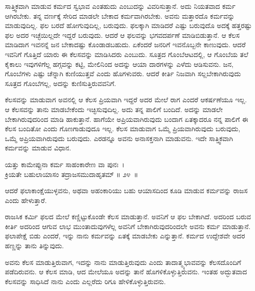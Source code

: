 ಸಾತ್ತ್ವಿಕವಾಗಿ ಮಾಡುವ ಕರ್ಮದ ಸ್ವಭಾವ ಎಂತಹುದು ಎಂಬುದನ್ನು ವಿವರಿಸುತ್ತಾನೆ. ಅದು ನಿಯತವಾದ ಕರ್ಮ ಆಗಿರಬೇಕು. ತನ್ನ ವರ್ಣಕ್ಕೆ ಸೇರಿದ ಮಾಡಲೇ ಬೇಕಾದ ಕರ್ಮವಾಗಿರಬೇಕು. ಅವನು ಮತ್ತಾರದೊ ಕರ್ಮವನ್ನು ಮಾಡುವುದಿಲ್ಲ. ಫಲ ಬರದೆ ಹೋಗುವುದಿಲ್ಲ, ಬರುವುದು. ಫಲಕ್ಕಾಗಿ ಮಾಡಿದರೆ ಎಷ್ಟು ಬರುವುದೊ ಅದಕ್ಕೆ ಹತ್ತರಷ್ಟು ಫಲ ಅದರ ಇಚ್ಛೆಯಿಲ್ಲದೇ ಇದ್ದರೆ ಬರುವುದು. ಆದರೆ ಆ ಫಲವನ್ನು ಭಗವದರ್ಪಣೆ ಮಾಡಿಬಿಡುತ್ತಾನೆ. ಆ ಕೆಲಸ ಮಾಡಿದಾಗ ಇವನನ್ನೆ ಜನ ಬೇಕಾದಷ್ಟು ಕೊಂಡಾಡಬಹುದು. ಏಕೆಂದರೆ ಜನರಿಗೆ ಇವನೊಬ್ಬನೇ ಕಾಣುವುದು. ಆದರೆ ಇವನಿಗೆ ಗೊತ್ತಿದೆ ಯಾರು ಈ ಕೆಲಸವನ್ನು ಮಾಡಿಸಿದರು ಎಂಬುದು. ಸೂತ್ರದ ಗೊಂಬೆಆಟದಲ್ಲಿ, ಆ ಗೊಂಬೆಯ ತಲೆ ಕೈಕಾಲು ಇವುಗಳಿಗೆಲ್ಲ ಹಗ್ಗವನ್ನು ಕಟ್ಟಿ, ಮೇಲಿನಿಂದ ಅದನ್ನು ಆಯಾ ದಾರಗಳನ್ನು ಎಳೆದು ಆಡಿಸುವನು. ಜನ, ಗೊಂಬೆಗಳು ಎಷ್ಟು ಚೆನ್ನಾಗಿ ಕುಣಿಯುತ್ತವೆ ಎಂದು ಹೊಗಳುವರು. ಆದರೆ ಕೀರ್ತಿ ನಿಜವಾಗಿ ಸಲ್ಲಬೇಕಾಗಿರುವುದು ಸೂತ್ರದ ಗೊಂಬೆಗಲ್ಲ, ಅದನ್ನು ಕುಣಿಸುತ್ತಿರುವವನಿಗೆ.

ಕೆಲಸವನ್ನು ಮಾಡುವಾಗ ಅವನಲ್ಲಿ ಆ ಕೆಲಸ ಪ್ರಿಯವಾಗಿ ಇದ್ದರೆ ಅದರ ಮೇಲೆ ರಾಗ ಎಂದರೆ ಆಕರ್ಷಣೆಯೂ ಇಲ್ಲ. ಆ ಕೆಲಸವನ್ನು ತಾನು ಮಾಡಬೇಕೆಂದು ಇಚ್ಛಿಸುವುದಿಲ್ಲ. ಅದು ತನ್ನ ಪಾಲಿಗೆ ಬಂದಿದೆ. ಅದನ್ನು ಮಾಡಲೇ ಬೇಕಾಗಿರುವುದರಿಂದ ಮಾಡಿ ಹಾಕುತ್ತಾನೆ. ಹಾಗೆಯೇ ಅಪ್ರಿಯವಾಗಿರುವುದು ಬಂದಾಗ ಏತಕ್ಕಾದರೂ ನನ್ನ ಪಾಲಿಗೆ ಈ ಕೆಲಸ ಬಂದಿತೋ ಎಂದು ಗೊಣಗಾಡುವುದೂ ಇಲ್ಲ. ಕೆಲಸ ಮಾಡುವಾಗ ಒಮ್ಮೆ ಪ್ರಿಯವಾಗಿರುವುದು ಬರುವುದು, ಒಮ್ಮೆ ಅಪ್ರಿಯವಾಗಿರುವುದು ಬರುವುದು. ಎರಡನ್ನೂ ಅವನು ಅನಾಸಕ್ತನಾಗಿ ಮಾಡುವನು. ಇದೇ ಸಾತ್ತ್ವಿಕವಾಗಿ ಕರ್ಮವನ್ನು ಮಾಡುವ ವಿಧಾನ.

\begin{shloka}
ಯತ್ತು ಕಾಮೇಪ್ಸುನಾ ಕರ್ಮ ಸಾಹಂಕಾರೇಣ ವಾ ಪುನಃ~।\\ಕ್ರಿಯತೇ ಬಹುಲಾಯಾಸಂ ತದ್ರಾಜಸಮುದಾಹೃತಮ್ \hfill॥ ೨೪~॥
\end{shloka}

\begin{artha}
ಆದರೆ ಫಲಾಕಾಂಕ್ಷೆಯುಳ್ಳವನು, ಅಥವಾ ಅಹಂಕಾರಿಯು ಬಹು ಆಯಾಸದಿಂದ ಕೂಡಿ ಮಾಡುವ ಕರ್ಮವನ್ನು ರಾಜಸ ಎಂದು ಹೇಳುತ್ತಾರೆ.
\end{artha}

ರಾಜಸಿಕ ಕರ್ಮಿ ಫಲದ ಮೇಲೆ ಕಣ್ಣಿಟ್ಟುಕೊಂಡೇ ಕೆಲಸ ಮಾಡುತ್ತಾನೆ. ಅವನಿಗೆ ಆ ಫಲ ಬೇಕಾಗಿದೆ. ಅದರಿಂದ ಬರುವ ಕೀರ್ತಿ ಅದರಿಂದ ಆಗುವ ಲಾಭ ಮುಂತಾದುವುಗಳೆಲ್ಲ ಅವನಿಗೆ ಬೇಕಾಗಿರುವುದರಿಂದಲೇ ಅವನು ಕರ್ಮ ಮಾಡುತ್ತಾನೆ. ಫಲಾಪೇಕ್ಷೆ ಬಿಡು ಎಂದರೆ, ಇನ್ನು ನಾನು ಕರ್ಮವನ್ನು ಏತಕ್ಕೆ ಮಾಡಬೇಕು ಎನ್ನುತ್ತಾನೆ. ಕರ್ಮದ ಉದ್ದೇಶವೇ ಅದರ ಹಣ್ಣನ್ನು ತಾನು ತಿನ್ನುವುದು.

ಅವನು ಕೆಲಸ ಮಾಡುತ್ತಿರುವಾಗ, ಇದನ್ನು ನಾನು ಮಾಡುತ್ತಿರುವುದು ಎಂದು ತಾದಾತ್ಮ್ಯ\-ಭಾವವನ್ನು ಕೆಲಸದೊಂದಿಗೆ ಪಡೆದಿರುವನು. ಆ ಕೆಲಸ ಮಾಡಿ, ಆದ ಮೇಲೆಯೂ ಅದನ್ನು ತಾನೆ ಹೊಗಳಿಕೊಳ್ಳುತ್ತಿರುವನು. ಇಂತಹ ಅದ್ಭುತವಾದ ಕೆಲಸವನ್ನು ಸಾಧಿಸಿದೆ ನಾನು ಎಂದು ಎಲ್ಲರೆದು ರಿಗೂ ಹೇಳಿಕೊಳ್ಳುತ್ತಿರುವನು.

